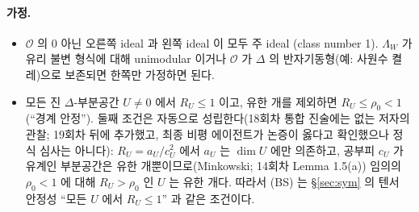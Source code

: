 \paragraph{가정.}
\begin{itemize}
\item[(h1)] $\mathcal O$ 의 0 아닌 오른쪽 ideal 과 왼쪽 ideal 이 모두 주 ideal (class number 1). $\Lambda_W$ 가 유리 불변 형식에 대해 unimodular 이거나 $\mathcal O$ 가 $\Delta$ 의 반자기동형(예: 사원수 켤레)으로 보존되면 한쪽만 가정하면 된다.
\item[(BS)] 모든 진 $\Delta$-부분공간 $U\ne0$ 에서 $R_U\le1$ 이고, 유한 개를 제외하면 $R_U\le\rho_0<1$ (``경계 안정''). 둘째 조건은 자동으로 성립한다(18회차 통합 진술에는 없는 저자의 관찰; 19회차 뒤에 추가했고, 최종 비평 에이전트가 논증이 옳다고 확인했으나 정식 심사는 아니다): $R_U=a_U/c_U^2$ 에서 $a_U$ 는 $\dim U$ 에만 의존하고, 공부피 $c_U$ 가 유계인 부분공간은 유한 개뿐이므로(Minkowski; 14회차 Lemma 1.5(a)) 임의의 $\rho_0<1$ 에 대해 $R_U>\rho_0$ 인 $U$ 는 유한 개다. 따라서 (BS) 는 \S\ref{sec:sym} 의 텐서 안정성 ``모든 $U$ 에서 $R_U\le1$'' 과 같은 조건이다.
\end{itemize}
